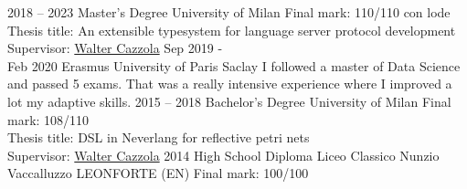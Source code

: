 \documentclass[9pt]{developercv} %
\begin{document}



\begin{entrylist}
	\entry
		{2018 -- 2023}
		{Master's Degree}
		{University of Milan}
		{
			Final mark: 110/110 con lode\\
			Thesis title: An extensible typesystem for language server protocol development\\
			Supervisor: \href{https://cazzola.di.unimi.it}{Walter Cazzola}
		}
	\entry
	{Sep 2019 - \\Feb 2020}
	{Erasmus}
	{University of Paris Saclay}
	{
		I followed a master of Data Science and passed 5 exams.
		That was a really intensive experience where I improved a lot my adaptive skills.
	}
	\entry
	{2015 -- 2018}
	{Bachelor's Degree}
	{University of Milan}
	{
		Final mark: 108/110\\
		Thesis title: DSL in Neverlang for reflective petri nets\\
		Supervisor: \href{https://cazzola.di.unimi.it}{Walter Cazzola}
	}
	\entry
	{2014}
	{High School Diploma}
	{Liceo Classico Nunzio Vaccalluzzo LEONFORTE (EN)}
	{
		Final mark: 100/100\\
	}
\end{entrylist}
\end{document}
